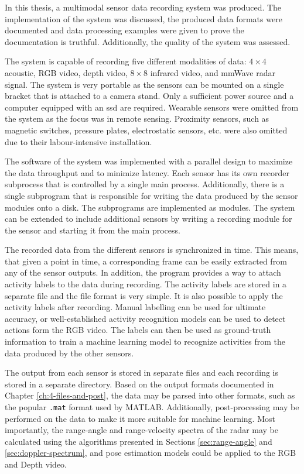 In this thesis,
a multimodal sensor data recording system was produced.
The implementation of the system was discussed,
the produced data formats were documented and data processing examples were given to prove the documentation is truthful.
Additionally, the quality of the system was assessed.

The system is capable of recording five different modalities of data:
$4 \times 4$ acoustic, RGB video, depth video, $8 \times 8$ infrared video, and mmWave radar signal.
The system is very portable as the sensors can be mounted on a single bracket that is attached to a camera stand.
Only a sufficient power source and a computer equipped with an \gls{ssd} are required.
Wearable sensors were omitted from the system as the focus was in remote sensing.
Proximity sensors, such as magnetic switches, pressure plates, electrostatic sensors, etc. were also omitted
due to their labour-intensive installation.

The software of the system was implemented with a parallel design to maximize the data throughput and to minimize latency.
Each sensor has its own recorder subprocess that is controlled by a single main process.
Additionally, there is a single subprogram that is responsible for writing the data produced by the sensor modules onto a disk.
The subprograms are implemented as modules.
The system can be extended to include additional sensors by writing a recording module for the sensor
and starting it from the main process.

The recorded data from the different sensors is synchronized in time.
This means, that given a point in time, a corresponding frame can be easily extracted from any of the sensor outputs.
In addition, the program provides a way to attach activity labels to the data during recording.
The activity labels are stored in a separate file and the file format is very simple.
It is also possible to apply the activity labels after recording.
Manual labelling can be used for ultimate accuracy, or well-established activity recognition models can be used to detect actions form the RGB video.
The labels can then be used as ground-truth information to train a machine learning model to recognize activities from the data produced by the other sensors.

The output from each sensor is stored in separate files and each recording is stored in a separate directory.
Based on the output formats documented in Chapter \ref{ch:4-files-and-post},
the data may be parsed into other formats, such as the popular \texttt{.mat} format used by MATLAB.
Additionally, post-processing may be performed on the data to make it more suitable for machine learning.
Most importantly, the range-angle and range-velocity spectra of the radar may be calculated
using the algorithms presented in Sections \ref{sec:range-angle} and \ref{sec:doppler-spectrum},
and pose estimation models could be applied to the RGB and Depth video.

